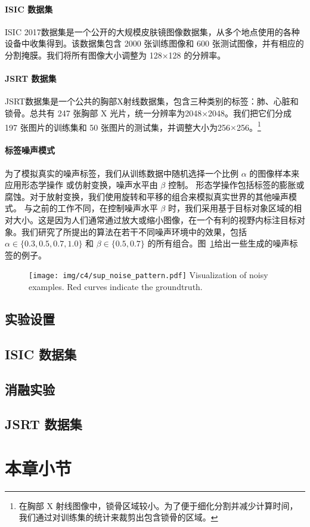 \paragraph{ISIC 数据集}
ISIC 2017数据集\citep{Gutman2018SkinLA}是一个公开的大规模皮肤镜图像数据集，从多个地点使用的各种设备中收集得到。该数据集包含 2000 张训练图像和 600 张测试图像，并有相应的分割掩膜。我们将所有图像大小调整为 128$\times$128 的分辨率。

\paragraph{JSRT 数据集}
JSRT数据集\citep{Shiraishi2000DevelopmentOA,Ginneken2006SegmentationOA}是一个公共的胸部X射线数据集，包含三种类别的标签：肺、心脏和锁骨。总共有 247 张胸部 X 光片，统一分辨率为2048$\times$2048。我们把它们分成 197 张图片的训练集和 50 张图片的测试集，并调整大小为256$\times$256。\footnote{在胸部 X 射线图像中，锁骨区域较小。为了便于细化分割并减少计算时间，我们通过对训练集的统计来裁剪出包含锁骨的区域。}

\paragraph{标签噪声模式}
为了模拟真实的噪声标签，我们从训练数据中随机选择一个比例 $\alpha$ 的图像样本来应用形态学操作\citep{Zhu2019PickandLearnAQ, Zhang2020CharacterizingLE,Zhang2020RobustMI,Xue2020CascadedRL} 或仿射变换，噪声水平由 $\beta$ 控制。
形态学操作包括标签的膨胀或腐蚀。对于放射变换，我们使用旋转和平移的组合来模拟真实世界的其他噪声模式。
与之前的工作不同，在控制噪声水平 $\beta$ 时，我们采用基于目标对象区域的相对大小。这是因为人们通常通过放大或缩小图像，在一个有利的视野内标注目标对象。我们研究了所提出的算法在若干不同噪声环境中的效果，包括 $\alpha \in \{ 0.3, 0.5, 0.7, 1.0 \}$ 和 $\beta \in \{0.5, 0.7\}$ 的所有组合。图~\ref{fig:noise_pattern}给出一些生成的噪声标签的例子。
\begin{figure}[tbp]
	\centering 
	\texttt{[image: img/c4/sup\_noise\_pattern.pdf]}
    {Visualization of noisy examples. Red curves indicate the groundtruth.}
	\label{fig:noise_pattern}
\end{figure}


\subsection{实验设置}




\subsection{ISIC 数据集}




\subsection{消融实验}




\subsection{JSRT 数据集}




\section{本章小节}
